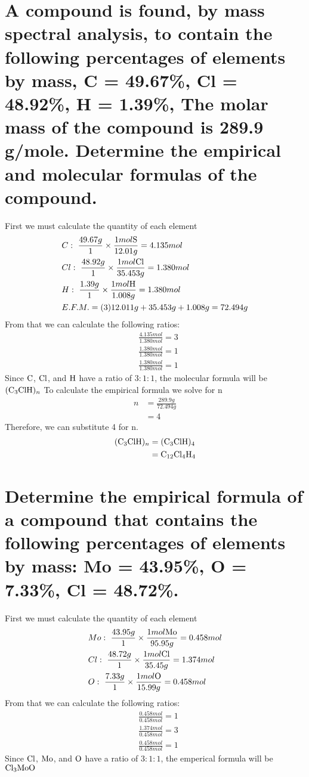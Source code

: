 \documentclass[11pt]{article}
\begin{document}
\section{A compound is found, by mass spectral analysis, to contain the following percentages of elements by mass, C = 49.67\%, Cl = 48.92\%, H = 1.39\%, The molar mass of the compound is 289.9 g/mole. Determine the empirical and molecular formulas of the compound.}
\label{sec:orgda785c2}
First we must calculate the quantity of each element
\begin{align*}
&C:\ \frac{49.67g}{1}\times\frac{1mol\ce{S}}{12.01g}=4.135mol\\
&Cl:\ \frac{48.92g}{1}\times\frac{1mol\ce{Cl}}{35.453g}=1.380mol\\
&H:\ \frac{1.39g}{1}\times\frac{1mol\ce{H}}{1.008g}=1.380mol\\
&E.F.M.=(3)12.011g+35.453g+1.008g=72.494g
\end{align*}
From that we can calculate the following ratios:
\begin{align*}
&\frac{4.135mol}{1.380mol}=3\\
&\frac{1.380mol}{1.380mol}=1\\
&\frac{1.380mol}{1.380mol}=1
\end{align*}
Since \(\ce{C}\), \(\ce{Cl}\), and  \(\ce{H}\) have a ratio of \(3:1:1\), the molecular formula will be \(\ce{(C3ClH)_n}\) To calculate the empirical formula we solve for n
\begin{align*}
n&=\frac{289.9g}{72.494g}\\
&=4
\end{align*}
Therefore, we can substitute 4 for n.
\begin{align*}
\ce{(C3ClH)_n}&=\ce{(C3ClH)4}\\
&=\ce{C12Cl4H4}
\end{align*}

\section{Determine the empirical formula of a compound that contains the following percentages of elements by mass: Mo = 43.95\%, O = 7.33\%, Cl = 48.72\%.}
\label{sec:org010357a}
First we must calculate the quantity of each element
\begin{align*}
&Mo:\ \frac{43.95g}{1}\times\frac{1mol\ce{Mo}}{95.95g}=0.458mol\\
&Cl:\ \frac{48.72g}{1}\times\frac{1mol\ce{Cl}}{35.45g}=1.374mol\\
&O:\ \frac{7.33g}{1}\times\frac{1mol\ce{O}}{15.99g}=0.458mol
\end{align*}
From that we can calculate the following ratios:
\begin{align*}
&\frac{0.458mol}{0.458mol}=1\\
&\frac{1.374mol}{0.458mol}=3\\
&\frac{0.458mol}{0.458mol}=1
\end{align*}
 Since \(\ce{Cl}\), \(\ce{Mo}\), and  \(\ce{O}\) have a ratio of \(3:1:1\), the
emperical formula will be  \(\ce{Cl3MoO}\)
\end{document}

